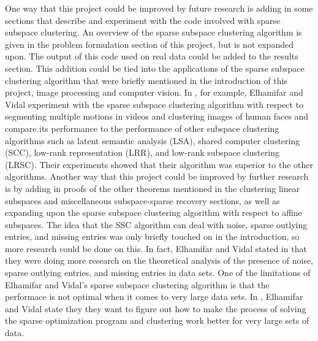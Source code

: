 \documentclass{article}
\begin{document}
One way that this project could be improved by future research is adding in some sections that describe and experiment with the code involved with sparse subspace clustering. An overview of the sparse subspace clustering algorithm is given in the problem formulation section of this project, but is not expanded upon. The output of this code used on real data could be added to the results section. This addition could be tied into the applications of the sparse subspace clustering algorithm that were briefly mentioned in the introduction of this project, image processing and computer vision. In \cite{elhamifar2012sparse}, for example, Elhamifar and Vidal experiment with the sparse subspace clustering algorithm with respect to segmenting multiple motions in videos and clustering images of human faces and compare its performance to the performance of other subspace clustering algorithms such as latent semantic analysis (LSA), shared computer clustering (SCC), low-rank representation (LRR), and low-rank subspace clustering (LRSC). Their experiments showed that their algorithm was superior to the other algorithms. Another way that this project could be improved by further research is by adding in proofs of the other theorems mentioned in the clustering linear subspaces and miscellaneous subspace-sparse recovery sections, as well as expanding upon the sparse subspace clustering algorithm with respect to affine subspaces. The idea that the SSC algorithm can deal with noise, sparse outlying entries, and missing entries was only briefly touched on in the introduction, so more research could be done on this. In fact, Elhamifar and Vidal stated in \cite{elhamifar2012sparse} that they were doing more research on the theoretical analysis of the presence of noise, sparse outlying entries, and missing entries in data sets. One of the limitations of Elhamifar and Vidal's sparse subspace clustering algorithm is that the performace is not optimal when it comes to very large data sets. In \cite{elhamifar2012sparse}, Elhamifar and Vidal state they they want to figure out how to make the process of solving the sparse optimization program and clustering work better for very large sets of data.    

\newpage


\end{document}
